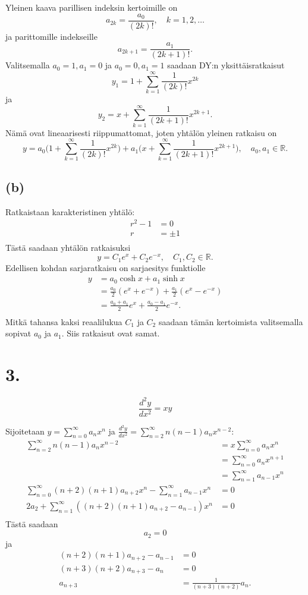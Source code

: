 \documentclass{article}
\begin{document}
Yleinen kaava parillisen indeksin kertoimille on
\[
  a_{2k} = \frac{a_0}{(2k)!}, \quad k = 1,2,\dots
\]
ja parittomille indekseille
\[
  a_{2k+1} = \frac{a_1}{(2k+1)!}.
\]
Valitsemalla $a_0 = 1, a_1 = 0$ ja $a_0 = 0, a_1 = 1$ saadaan DY:n
yksittäisratkaisut
\[
  y_1 = 1 + \sum_{k=1}^{\infty}\frac{1}{(2k)!}x^{2k}
\]
ja
\[
  y_2 = x + \sum_{k=1}^{\infty}\frac{1}{(2k+1)!}x^{2k+1}.
\]
Nämä ovat lineaarisesti riippumattomat, joten yhtälön yleinen ratkaisu on
\[
  y = a_0\Big(1 + \sum_{k=1}^{\infty}\frac{1}{(2k)!}x^{2k}\Big)
  + a_1\Big(x + \sum_{k=1}^{\infty}\frac{1}{(2k+1)!}x^{2k+1}\Big), \quad a_0,a_1 \in \mathbb{R}.
\]

\subsection*{(b)}

Ratkaistaan karakteristinen yhtälö:
\begin{align*}
  r^2 - 1 &= 0 \\
  r &= \pm 1 \\
\end{align*}
Tästä saadaan yhtälön ratkaisuksi
\[
  y = C_1e^{x} + C_2e^{-x}, \quad C_1,C_2 \in \mathbb{R}.
\]
Edellisen kohdan sarjaratkaisu on sarjaesitys funktiolle
\begin{align*}
  y &= a_0\cosh x + a_1\sinh x \\
    &= \frac{a_0}{2}(e^x + e^{-x}) + \frac{a_1}{2}(e^x - e^{-x}) \\
    &= \frac{a_0 + a_1}{2}e^x + \frac{a_0 - a_1}{2}e^{-x}. \\
\end{align*}
Mitkä tahansa kaksi reaalilukua $C_1$ ja $C_2$ saadaan tämän
kertoimista valitsemalla sopivat $a_0$ ja $a_1$. Siis ratkaisut ovat samat.

\section*{3.}

\[
  \frac{d^2 y}{d x^2} = xy
\]

Sijoitetaan $y = \sum_{n=0}^{\infty} a_nx^n$ ja
$\frac{d^2 y}{d x^2} = \sum_{n=2}^{\infty} n(n-1)a_nx^{n-2}$:
\begin{align*}
  \sum_{n=2}^{\infty} n(n-1)a_nx^{n-2} &= x\sum_{n=0}^{\infty} a_nx^n \\
                                       &= \sum_{n=0}^{\infty} a_nx^{n+1} \\
                                       &= \sum_{n=1}^{\infty} a_{n-1}x^{n} \\
  \sum_{n=0}^{\infty} (n+2)(n+1)a_{n+2}x^{n} - \sum_{n=1}^{\infty} a_{n-1}x^{n} &= 0\\
  2a_2 + \sum_{n=1}^{\infty} ((n+2)(n+1)a_{n+2} - a_{n-1})x^{n} &= 0\\
\end{align*}
Tästä saadaan
\[
  a_2 = 0
\]
ja
\begin{align*}
  (n+2)(n+1)a_{n+2} - a_{n-1} &= 0 \\
  (n+3)(n+2)a_{n+3} - a_n &= 0 \\
  a_{n+3} &= \frac{1}{(n+3)(n+2)}a_n. \\
\end{align*}
\end{document}

